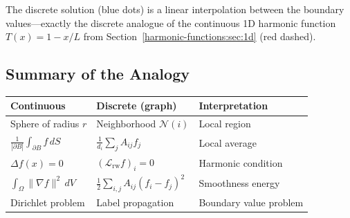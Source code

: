 \begin{notechapter}
\begin{examplebox}[title=The Path Graph (Discrete Rod)]
\begin{center}
\end{center}

The discrete solution (blue dots) is a linear interpolation between the
boundary values---exactly the discrete analogue of the continuous 1D
harmonic function $T(x) = 1 - x/L$ from Section~\ref{harmonic-functions:sec:1d} (red dashed).
\end{examplebox}

\subsection{Summary of the Analogy}

\begin{connectionbox}[title=Continuous $\longleftrightarrow$ Discrete]
\begin{center}
\begin{tabular}{lll}
\toprule
\textbf{Continuous} & \textbf{Discrete (graph)} & \textbf{Interpretation} \\
\midrule
Sphere of radius $r$ & Neighborhood $\mathcal{N}(i)$ & Local region \\[3pt]
$\displaystyle\frac{1}{|\partial B|}
  \int_{\partial B}\!f\,dS$ &
$\displaystyle\frac{1}{d_i}\sum_j A_{ij}f_j$ & Local average \\[6pt]
$\Delta f(x) = 0$ & $(\mathcal{L}_{\mathrm{rw}} f)_i = 0$ &
  Harmonic condition \\[3pt]
$\displaystyle\int_\Omega \|\nabla f\|^2\,dV$ &
$\displaystyle\frac{1}{2}\sum_{i,j} A_{ij}(f_i - f_j)^2$ &
  Smoothness energy \\[3pt]
Dirichlet problem & Label propagation & Boundary value problem \\
\bottomrule
\end{tabular}
\end{center}
\end{connectionbox}



\end{notechapter}
